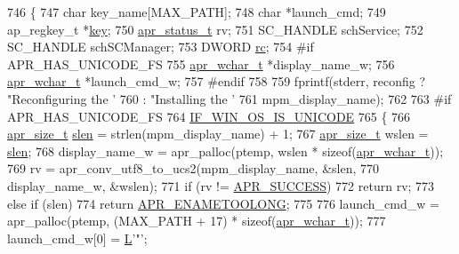 \begin{DoxyCode}
746 \{
747     \textcolor{keywordtype}{char} key\_name[MAX\_PATH];
748     \textcolor{keywordtype}{char} *launch\_cmd;
749     ap\_regkey\_t *\hyperlink{group__MOD__CACHE_ga11d8023381192746eb96be162398fe1c}{key};
750     \hyperlink{group__apr__errno_gaa5105fa83cc322f09382292db8b47593}{apr\_status\_t} rv;
751     SC\_HANDLE   schService;
752     SC\_HANDLE   schSCManager;
753     DWORD       \hyperlink{group__APACHE__CORE__CONFIG_ga2e051c0ce9ee165170cd7973f2464512}{rc};
754 \textcolor{preprocessor}{#if APR\_HAS\_UNICODE\_FS}
755     \hyperlink{apr__arch__utf8_8h_a72c93c6f539bceb60f263635adeb71b6}{apr\_wchar\_t} *display\_name\_w;
756     \hyperlink{apr__arch__utf8_8h_a72c93c6f539bceb60f263635adeb71b6}{apr\_wchar\_t} *launch\_cmd\_w;
757 \textcolor{preprocessor}{#endif}
758 
759     fprintf(stderr, reconfig ? \textcolor{stringliteral}{"Reconfiguring the '%
760                              : \textcolor{stringliteral}{"Installing the '%
761                     mpm\_display\_name);
762 
763 \textcolor{preprocessor}{#if APR\_HAS\_UNICODE\_FS}
764     \hyperlink{win32_2apr__arch__misc_8h_a8c631486790f65bd87ed0623a25bdd3d}{IF\_WIN\_OS\_IS\_UNICODE}
765     \{
766         \hyperlink{group__apr__platform_gaaa72b2253f6f3032cefea5712a27540e}{apr\_size\_t} \hyperlink{group__APR__Util__Escaping_ga00eba03f583932b8cdcec6e0847f08b3}{slen} = strlen(mpm\_display\_name) + 1;
767         \hyperlink{group__apr__platform_gaaa72b2253f6f3032cefea5712a27540e}{apr\_size\_t} wslen = \hyperlink{group__APR__Util__Escaping_ga00eba03f583932b8cdcec6e0847f08b3}{slen};
768         display\_name\_w = apr\_palloc(ptemp, wslen * \textcolor{keyword}{sizeof}(\hyperlink{apr__arch__utf8_8h_a72c93c6f539bceb60f263635adeb71b6}{apr\_wchar\_t}));
769         rv = apr\_conv\_utf8\_to\_ucs2(mpm\_display\_name, &slen,
770                                    display\_name\_w, &wslen);
771         \textcolor{keywordflow}{if} (rv != \hyperlink{group__apr__errno_ga9ee311b7bf1c691dc521d721339ee2a6}{APR\_SUCCESS})
772             \textcolor{keywordflow}{return} rv;
773         \textcolor{keywordflow}{else} \textcolor{keywordflow}{if} (slen)
774             \textcolor{keywordflow}{return} \hyperlink{group__APR__Error_ga3db63b16c2b332efe441e2661f593377}{APR\_ENAMETOOLONG};
775 
776         launch\_cmd\_w = apr\_palloc(ptemp, (MAX\_PATH + 17) * \textcolor{keyword}{sizeof}(\hyperlink{apr__arch__utf8_8h_a72c93c6f539bceb60f263635adeb71b6}{apr\_wchar\_t}));
777         launch\_cmd\_w[0] = \hyperlink{mod__lua_8h_a62f94dfc0036bec0c14106c2f15caf3e}{L}\textcolor{charliteral}{'"'};
}}
\end{DoxyCode}
